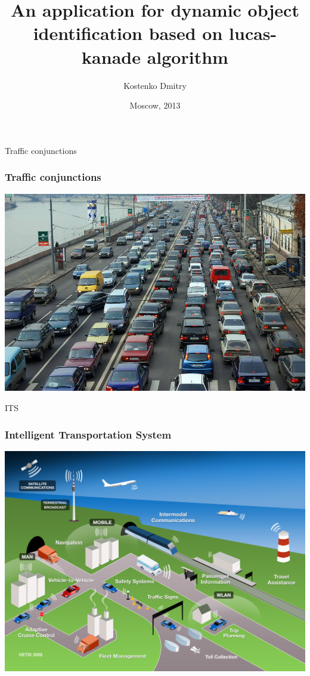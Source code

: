 \documentclass{beamer}
\begin{document}
\title{An application for dynamic object identification based on lucas-kanade algorithm}  
\author{Kostenko Dmitry}

\date{Moscow, 2013} 
\frame{\titlepage}




\begin{frame}{Traffic conjunctions}
	\frametitle{Traffic conjunctions}
	\begin{center}
		\includegraphics[width= 0.8\linewidth]{images/traffic_jam.jpg}  
	\end{center}
\end{frame}



\begin{frame}{ITS}
	\frametitle{Intelligent Transportation System}
	\begin{center}
		\includegraphics[width= 0.8\linewidth]{images/its.jpg}  
	\end{center}
\end{frame}
\end{document}
